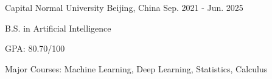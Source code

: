 

\begin{cventries}

  \cventry
  {} %
  {Capital Normal University} %
  {Beijing, China} %
  {Sep. 2021 - Jun. 2025} %
  {
    \begin{cvitems} %
      \item{B.S. in Artificial Intelligence}
      \item {GPA: 80.70/100} %
      \item {Major Courses: Machine Learning, Deep Learning, Statistics, Calculus}
    \end{cvitems}
  }

\end{cventries}
